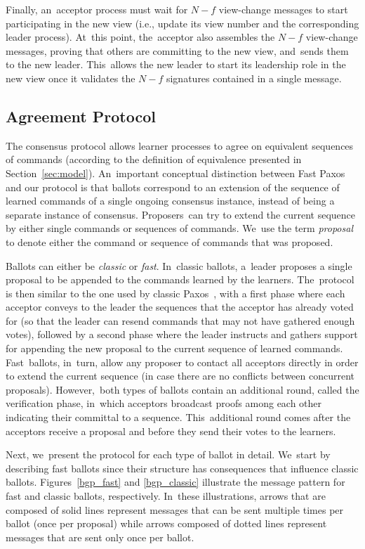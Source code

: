 \documentclass[algorithms,article,accept,moreauthors,pdftex,10pt,a4paper]{Definitions/mdpi}
\begin{document}
Finally, an~acceptor process must wait for $N-f$ view-change messages to start participating in the new view (i.e., update its view number and the corresponding leader process). At~this point, the~acceptor also assembles the $N-f$ view-change messages, proving that others are committing to the new view, and~sends them to the new leader. This~allows the new leader to start its leadership role in the new view once it validates the $N-f$ signatures contained in a single message.

\subsection{Agreement Protocol} 

The consensus protocol allows learner processes to agree on equivalent sequences of commands (according to the definition of equivalence presented in Section~\ref{sec:model}). An~important conceptual distinction between Fast Paxos~\cite{L06} and our protocol is that ballots correspond to an extension of the sequence of learned commands of a single ongoing consensus instance, instead of being a separate instance of consensus. Proposers~can try to extend the current sequence by either single commands or sequences of commands. We~use the term \textit{proposal} to denote either the command or sequence of commands that was proposed.\par
Ballots can either be \textit{classic} or \textit{fast}. In~classic ballots, a~leader proposes a single proposal to be appended to the commands learned by the learners. The~protocol is then similar to the one used by classic Paxos~\cite{Lam98}, with a first phase where each acceptor conveys to the leader the sequences that the acceptor has already voted for (so that the leader can resend commands that may not have gathered enough votes), followed by a second phase where the leader instructs and gathers support for appending the new proposal to the current sequence of learned commands. Fast~ballots, in~turn, allow any proposer to contact all acceptors directly in order to extend the current sequence (in case there are no conflicts between concurrent proposals). However,~both types of ballots contain an additional round, called the verification phase, in~which acceptors broadcast proofs among each other indicating their committal to a sequence. This~additional round comes after the acceptors receive a proposal and before they send their votes to the learners.\par
Next, we~present the protocol for each type of ballot in detail. We~start by describing fast ballots since their structure has consequences that influence classic ballots. Figures~\ref{bgp_fast} and \ref{bgp_classic} illustrate the message pattern for fast and classic ballots, respectively. In~these illustrations, arrows that are composed of solid lines represent messages that can be sent multiple times per ballot (once per proposal) while arrows composed of dotted lines represent messages that are sent only once per ballot.
\end{document}
